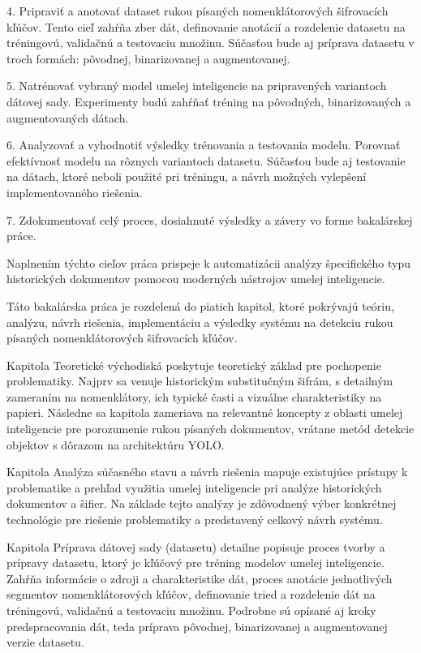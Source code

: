 4. Pripraviť a anotovať dataset rukou písaných nomenklátorových šifrovacích kľúčov. Tento cieľ zahŕňa zber dát, definovanie anotácií a rozdelenie datasetu na tréningovú, validačnú a testovaciu množinu. Súčasťou bude aj príprava datasetu v troch formách: pôvodnej, binarizovanej a augmentovanej. 

5. Natrénovať vybraný model umelej inteligencie na pripravených variantoch dátovej sady. Experimenty budú zahŕňať tréning na pôvodných, binarizovaných a augmentovaných dátach. 

6. Analyzovať a vyhodnotiť výsledky trénovania a testovania modelu. Porovnať efektívnosť modelu na rôznych variantoch datasetu. Súčasťou bude aj testovanie na dátach, ktoré neboli použité pri tréningu, a návrh možných vylepšení implementovaného riešenia. 

7. Zdokumentovať celý proces, dosiahnuté výsledky a závery vo forme bakalárskej práce.

Naplnením týchto cieľov práca prispeje k automatizácii analýzy špecifického typu historických dokumentov pomocou moderných nástrojov umelej inteligencie.

Táto bakalárska práca je rozdelená do piatich kapitol, ktoré pokrývajú teóriu, analýzu, návrh riešenia, implementáciu a výsledky systému na detekciu rukou písaných nomenklátorových šifrovacích kľúčov.

Kapitola Teoretické východiská poskytuje teoretický základ pre pochopenie problematiky. Najprv sa venuje historickým substitučným šifrám, s detailným zameraním na nomenklátory, ich typické časti a vizuálne charakteristiky na papieri. Následne sa kapitola zameriava na relevantné koncepty z oblasti umelej inteligencie pre porozumenie rukou písaných dokumentov, vrátane metód detekcie objektov s dôrazom na architektúru YOLO.

Kapitola Analýza súčasného stavu a návrh riešenia mapuje existujúce prístupy k problematike a prehľad využitia umelej inteligencie pri analýze historických dokumentov a šifier. Na základe tejto analýzy je zdôvodnený výber konkrétnej technológie pre riešenie problematiky a predstavený celkový návrh systému.

Kapitola Príprava dátovej sady (datasetu) detailne popisuje proces tvorby a prípravy datasetu, ktorý je kľúčový pre tréning modelov umelej inteligencie. Zahŕňa informácie o zdroji a charakteristike dát, proces anotácie jednotlivých segmentov nomenklátorových kľúčov, definovanie tried a rozdelenie dát na tréningovú, validačnú a testovaciu množinu. Podrobne sú opísané aj kroky predspracovania dát, teda príprava pôvodnej, binarizovanej a augmentovanej verzie datasetu.

